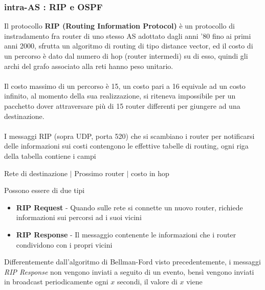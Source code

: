 \documentclass[12pt, letterpaper]{article}
\newcommand{\acc}{\\\hphantom{}\\}
\begin{document}
\subsubsection{intra-AS : RIP e OSPF}\label{intraAs}
Il protocollo \textbf{RIP (Routing Information Protocol)} è un protocollo di instradamento fra router di uno stesso AS adottato dagli anni '80 fino 
ai primi anni 2000, sfrutta un algoritmo di routing di tipo distance vector, ed il costo di un percorso è dato dal 
numero di hop (router intermedi) su di esso, quindi gli archi del grafo associato alla reti hanno peso unitario.\acc 
Il costo massimo di un percorso è 15, un costo pari a 16 equivale ad un costo infinito, al momento della sua realizzazione, si 
riteneva impossibile per un pacchetto dover attraversare più di 15 router differenti per giungere ad una destinazione.\acc 
I messaggi RIP (sopra UDP, porta 520)  che si scambiano i router  per notificarsi delle informazioni sui costi contengono le effettive tabelle  
di routing, ogni riga della tabella contiene i campi \begin{center}
    Rete di destinazione $\Big\vert $ Prossimo router $\Big\vert $ costo in hop
\end{center}
Possono essere di due tipi\begin{itemize}
    \item \textbf{RIP Request} - Quando sulle rete si connette un nuovo router, richiede informazioni sui percorsi ad 
    i suoi vicini  
    \item \textbf{RIP Response} - Il messaggio contenente le informazioni che i router condividono con i propri vicini 
\end{itemize}
Differentemente dall'algoritmo di Bellman-Ford visto precedentemente, i messaggi \textit{RIP Response} non vengono inviati 
a seguito di un evento, bensì vengono inviati in broadcast periodicamente ogni $x$ secondi, il valore di $x$ viene 
\end{document}
